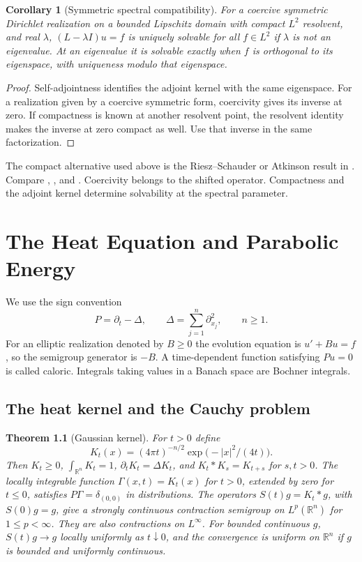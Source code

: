 \documentclass[11pt,oneside,openany]{book}
\theoremstyle{plain}
\newtheorem{theorem}{Theorem}[chapter]
\newtheorem{corollary}[theorem]{Corollary}
\theoremstyle{definition}
\theoremstyle{remark}
\begin{document}
\begin{corollary}[Symmetric spectral compatibility]
\label{pde:elliptic-symmetric-fredholm}
For a coercive symmetric Dirichlet realization on a bounded
Lipschitz domain with compact \(L^2\) resolvent, and real
\(\lambda\), \((L-\lambda I)u=f\) is uniquely solvable for
all \(f\in L^2\) if \(\lambda\) is not an eigenvalue.
At an eigenvalue it is solvable exactly when \(f\) is
orthogonal to its eigenspace, with uniqueness modulo that
eigenspace.
\end{corollary}

\begin{proof}
Self-adjointness identifies the adjoint kernel with the
same eigenspace. For a realization given by a coercive
symmetric form, coercivity gives its inverse at zero.
If compactness is known at another resolvent point,
the resolvent identity makes the inverse at zero compact
as well. Use that inverse in the same factorization.
\end{proof}

The compact alternative used above is the Riesz--Schauder
or Atkinson result in \cite{D16}. Compare
\cite[Section 6.2.3]{Evans}, \cite[Sections 9.2.3 and 9.3.1]{RR},
and \cite[Section 8.2]{GT}. Coercivity belongs to the shifted
operator. Compactness and the adjoint kernel determine
solvability at the spectral parameter.
\chapter{The Heat Equation and Parabolic Energy}
\label{chap:heat}

We use the sign convention
\[
  P=\partial_t-\Delta,\qquad
  \Delta=\sum_{j=1}^n\partial_{x_j}^2,\qquad n\geq 1.
\]
For an elliptic realization denoted by \(B\geq0\) the evolution
equation is \(u'+Bu=f\), so the semigroup generator is \(-B\).
A time-dependent function satisfying \(Pu=0\) is called caloric.
Integrals taking values in a Banach space are Bochner integrals.

\section{The heat kernel and the Cauchy problem}
\label{pde:H01}

\begin{theorem}[Gaussian kernel]
\label{pde:heat-gaussian}
For \(t>0\) define
\[
 K_t(x)=(4\pi t)^{-n/2}\exp\bigl(-|x|^2/(4t)\bigr).
\]
Then \(K_t\geq0\), \(\int_{\mathbb R^n}K_t=1\),
\(\partial_tK_t=\Delta K_t\), and \(K_t*K_s=K_{t+s}\) for \(s,t>0\).
The locally integrable function \(\Gamma(x,t)=K_t(x)\) for \(t>0\),
extended by zero for \(t\leq0\), satisfies \(P\Gamma=\delta_{(0,0)}\)
in distributions. The operators \(S(t)g=K_t*g\), with \(S(0)g=g\),
give a strongly continuous contraction semigroup on
\(L^p(\mathbb R^n)\) for \(1\leq p<\infty\).
They are also contractions on \(L^\infty\).
For bounded continuous \(g\), \(S(t)g\to g\) locally uniformly
as \(t\downarrow0\), and the convergence is uniform on \(\mathbb R^n\)
if \(g\) is bounded and uniformly continuous.
\end{theorem}
\end{document}
